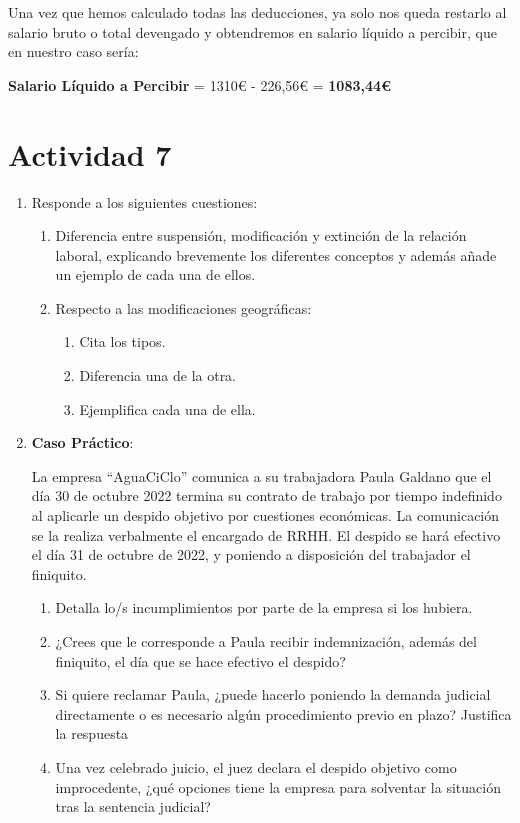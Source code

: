 \begin{itemize}
    Una vez que hemos calculado todas las deducciones, ya solo nos queda restarlo al salario bruto o total devengado y obtendremos en salario líquido a percibir, que en nuestro caso sería:

       \vspace{3ex}
       \centering\textbf{Salario Líquido a Percibir} = 1310€ - 226,56€ = \textbf{1083,44€}

\end{itemize}

\section{Actividad 7}
\begin{enumerate}
    \item Responde a los siguientes cuestiones:
    \begin{enumerate}
        \item Diferencia entre suspensión, modificación y extinción de la relación laboral, explicando brevemente los diferentes conceptos y además añade un ejemplo de cada una de ellos.
        \item Respecto a las modificaciones geográficas:
        \begin{enumerate}
            \item Cita los tipos.
            \item Diferencia una de la otra.
            \item Ejemplifica cada una de ella.
        \end{enumerate}
    \end{enumerate}

    \item \textbf{Caso Práctico}:

    La empresa ``AguaCiClo'' comunica a su trabajadora Paula Galdano que el día 30 de octubre 2022 termina su contrato de trabajo por tiempo indefinido al aplicarle un despido objetivo por cuestiones económicas. La comunicación se la realiza verbalmente el encargado de RRHH.  El despido se hará efectivo el día 31 de octubre de 2022, y poniendo a disposición del trabajador el finiquito.

    \begin{enumerate}
        \item Detalla lo/s incumplimientos por parte de la empresa si los hubiera.
        \item ¿Crees que  le corresponde a Paula recibir indemnización, además del finiquito, el día que se hace efectivo el despido?
        \item Si quiere reclamar Paula, ¿puede hacerlo poniendo la demanda judicial directamente o es necesario algún procedimiento previo en plazo? Justifica la respuesta
        \item Una vez celebrado juicio, el juez declara el despido objetivo como improcedente, ¿qué opciones tiene la empresa para solventar la situación tras la sentencia judicial?
    \end{enumerate}
\end{enumerate}




\newpage



